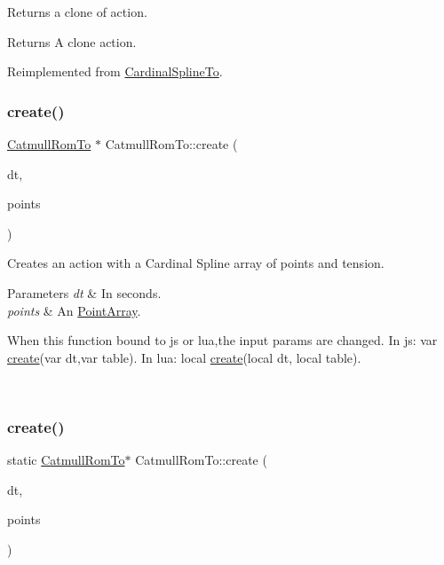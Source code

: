 Returns a clone of action.

\begin{DoxyReturn}{Returns}
A clone action. 
\end{DoxyReturn}


Reimplemented from \hyperlink{classCardinalSplineTo_aed2a776edc3e26b2ba7524230edf42de}{Cardinal\+Spline\+To}.

\mbox{\label{classCatmullRomTo_a8bd98d010b26d17f96baa9b21b7ebd8e}} 
\subsubsection{\texorpdfstring{create()}{create()}\hspace{0.1cm}{\footnotesize\ttfamily [1/2]}}
{\footnotesize\ttfamily \hyperlink{classCatmullRomTo}{Catmull\+Rom\+To} $\ast$ Catmull\+Rom\+To\+::create (\begin{DoxyParamCaption}\item[{float}]{dt,  }\item[{\hyperlink{classPointArray}{Point\+Array} $\ast$}]{points }\end{DoxyParamCaption})\hspace{0.3cm}{\ttfamily [static]}}

Creates an action with a Cardinal Spline array of points and tension. 
\begin{DoxyParams}{Parameters}
{\em dt} & In seconds. \\
\hline
{\em points} & An \hyperlink{classPointArray}{Point\+Array}. 
\begin{DoxyCode}
When \textcolor{keyword}{this} \textcolor{keyword}{function} bound to js or lua,the input params are changed.
In js: var \hyperlink{classCatmullRomTo_a8bd98d010b26d17f96baa9b21b7ebd8e}{create}(var dt,var table).
In lua: local \hyperlink{classCatmullRomTo_a8bd98d010b26d17f96baa9b21b7ebd8e}{create}(local dt, local table).
\end{DoxyCode}
 \\
\hline
\end{DoxyParams}
\mbox{\label{classCatmullRomTo_a2aef004ee68f0a2683d12a89fd88696e}} 
\subsubsection{\texorpdfstring{create()}{create()}\hspace{0.1cm}{\footnotesize\ttfamily [2/2]}}
{\footnotesize\ttfamily static \hyperlink{classCatmullRomTo}{Catmull\+Rom\+To}$\ast$ Catmull\+Rom\+To\+::create (\begin{DoxyParamCaption}\item[{float}]{dt,  }\item[{\hyperlink{classPointArray}{Point\+Array} $\ast$}]{points }\end{DoxyParamCaption})\hspace{0.3cm}{\ttfamily [static]}}

